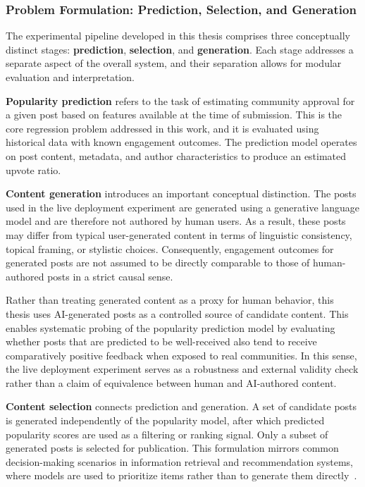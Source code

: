 \subsubsection*{Problem Formulation: Prediction, Selection, and Generation}
\label{subsec:problem_formulation}

The experimental pipeline developed in this thesis comprises three conceptually distinct stages: \textbf{prediction}, \textbf{selection}, and \textbf{generation}. Each stage addresses a separate aspect of the overall system, and their separation allows for modular evaluation and interpretation.

\textbf{Popularity prediction} refers to the task of estimating community approval for a given post based on features available at the time of submission. This is the core regression problem addressed in this work, and it is evaluated using historical data with known engagement outcomes. The prediction model operates on post content, metadata, and author characteristics to produce an estimated upvote ratio.

\textbf{Content generation} introduces an important conceptual distinction. The posts used in the live deployment experiment are generated using a generative language model and are therefore not authored by human users. As a result, these posts may differ from typical user-generated content in terms of linguistic consistency, topical framing, or stylistic choices. Consequently, engagement outcomes for generated posts are not assumed to be directly comparable to those of human-authored posts in a strict causal sense.

Rather than treating generated content as a proxy for human behavior, this thesis uses AI-generated posts as a controlled source of candidate content. This enables systematic probing of the popularity prediction model by evaluating whether posts that are predicted to be well-received also tend to receive comparatively positive feedback when exposed to real communities. In this sense, the live deployment experiment serves as a robustness and external validity check rather than a claim of equivalence between human and AI-authored content.

\textbf{Content selection} connects prediction and generation. A set of candidate posts is generated independently of the popularity model, after which predicted popularity scores are used as a filtering or ranking signal. Only a subset of generated posts is selected for publication. This formulation mirrors common decision-making scenarios in information retrieval and recommendation systems, where models are used to prioritize items rather than to generate them directly~\cite{huang2024comprehensive}.

